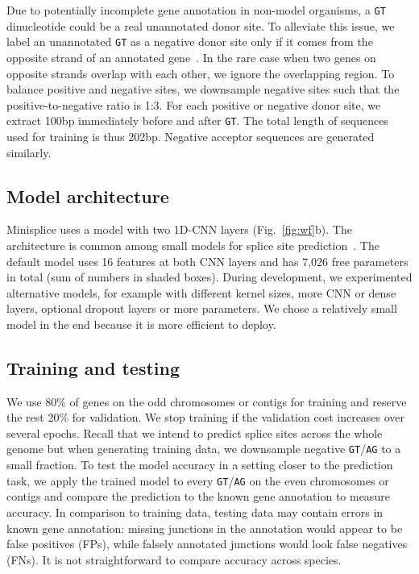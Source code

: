 \documentclass[webpdf,contemporary,large,namedate]{oup-authoring-template}%
\begin{document}
Due to potentially incomplete gene annotation in non-model organisms,
a {\tt GT} dinucleotide could be a real unannotated donor site.
To alleviate this issue, we label an unannotated {\tt GT} as a negative donor site
only if it comes from the opposite strand of an annotated gene~\citep{Chao:2024aa}.
In the rare case when two genes on opposite strands overlap with each other,
we ignore the overlapping region.
To balance positive and negative sites,
we downsample negative sites such that the positive-to-negative ratio is 1:3.
For each positive or negative donor site,
we extract 100bp immediately before and after {\tt GT}.
The total length of sequences used for training is thus 202bp.
Negative acceptor sequences are generated similarly.

\subsection{Model architecture}

Minisplice uses a model with two 1D-CNN layers (Fig.~\ref{fig:wf}b).
The architecture is common among small models for splice site prediction~\citep{Zabardast:2023aa}.
The default model uses 16 features at both CNN layers and has 7,026 free parameters in total (sum of numbers in shaded boxes).
During development, we experimented alternative models,
for example with different kernel sizes, more CNN or dense layers, optional dropout layers or more parameters.
We chose a relatively small model in the end because it is more efficient to deploy.

\subsection{Training and testing}

We use 80\% of genes on the odd chromosomes or contigs for training and reserve the rest 20\% for validation.
We stop training if the validation cost increases over several epochs.
Recall that we intend to predict splice sites across the whole genome
but when generating training data, we downsample negative {\tt GT}/{\tt AG} to a small fraction.
To test the model accuracy in a setting closer to the prediction task,
we apply the trained model to every {\tt GT}/{\tt AG} on the even chromosomes or contigs
and compare the prediction to the known gene annotation to measure accuracy.
In comparison to training data, testing data may contain errors in known gene annotation:
missing junctions in the annotation would appear to be false positives (FPs),
while falsely annotated junctions would look false negatives (FNs).
It is not straightforward to compare accuracy across species.
\end{document}
